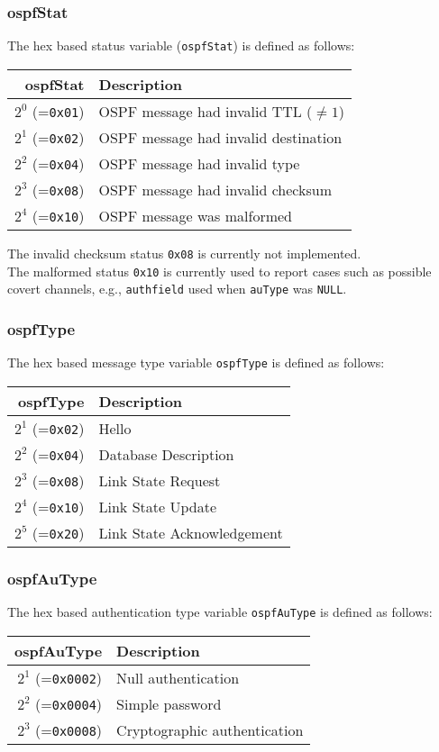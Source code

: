 \documentclass[documentation]{subfiles}
\begin{document}
\subsubsection{ospfStat}\label{ospfStat}
The hex based status variable ({\tt ospfStat}) is defined as follows:
\begin{longtable}{rl}
    \toprule
    {\bf ospfStat} & {\bf Description} \\
    \midrule\endhead%
    $2^0$ (={\tt 0x01}) & OSPF message had invalid TTL ($\neq1$)\\
    $2^1$ (={\tt 0x02}) & OSPF message had invalid destination\\
    $2^2$ (={\tt 0x04}) & OSPF message had invalid type\\
    $2^3$ (={\tt 0x08}) & OSPF message had invalid checksum\\
    $2^4$ (={\tt 0x10}) & OSPF message was malformed\\
    \bottomrule
\end{longtable}

The invalid checksum status {\tt 0x08} is currently not implemented.\\
The malformed status {\tt 0x10} is currently used to report cases such as possible covert channels, e.g., {\tt authfield} used when {\tt auType} was {\tt NULL}.\\

\subsubsection{ospfType}\label{ospfType}
The hex based message type variable {\tt ospfType} is defined as follows:
\begin{longtable}{rl}
    \toprule
    {\bf ospfType} & {\bf Description} \\
    \midrule\endhead%
    $2^1$ (={\tt 0x02}) & Hello\\
    $2^2$ (={\tt 0x04}) & Database Description\\
    $2^3$ (={\tt 0x08}) & Link State Request\\
    $2^4$ (={\tt 0x10}) & Link State Update\\
    $2^5$ (={\tt 0x20}) & Link State Acknowledgement\\
    \bottomrule
\end{longtable}

\subsubsection{ospfAuType}\label{ospfAuType}
The hex based authentication type variable {\tt ospfAuType} is defined as follows:
\begin{longtable}{rl}
    \toprule
    {\bf ospfAuType} & {\bf Description} \\
    \midrule\endhead%
    $2^1$ (={\tt 0x0002}) & Null authentication\\
    $2^2$ (={\tt 0x0004}) & Simple password\\
    $2^3$ (={\tt 0x0008}) & Cryptographic authentication\\
    \bottomrule
\end{longtable}
\end{document}
